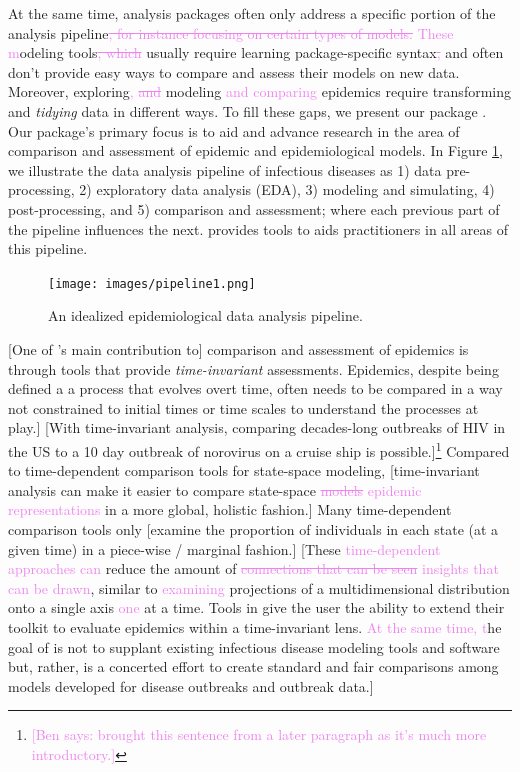 \documentclass[
  shortnames]{jss}
\begin{document}
At the same time, analysis packages often only address a specific
portion of the analysis
pipeline\textcolor{violet}{\sout{, for instance focusing on certain types of models.}}
\textcolor{violet}{These m}odeling
tools\textcolor{violet}{\sout{, which}} usually require learning
package-specific syntax\textcolor{violet}{\sout{,}} and often don't
provide easy ways to compare and assess their models on new data.
Moreover, exploring\textcolor{violet}{, \sout{and}} modeling
\textcolor{violet}{and comparing} epidemics require transforming and
\textit{tidying} data in different ways. To fill these gaps, we present
our  package . Our package's primary focus
is to aid and advance research in the area of comparison and assessment
of epidemic and epidemiological models. In Figure \ref{fig:pipeline}, we
illustrate the data analysis pipeline of infectious diseases as 1) data
pre-processing, 2) exploratory data analysis (EDA), 3) modeling and
simulating, 4) post-processing, and 5) comparison and assessment; where
each previous part of the pipeline influences the next. 
provides tools to aids practitioners in all areas of this pipeline.

\begin{figure}[!ht]
    \centering
    \texttt{[image: images/pipeline1.png]}
    \caption{An idealized epidemiological data analysis pipeline.}
    \label{fig:pipeline}
\end{figure}

{[}One of 's main contribution to{]} comparison and
assessment of epidemics is through tools that provide
\textit{time-invariant} assessments. Epidemics, despite being defined a
a process that evolves overt time, often needs to be compared in a way
not constrained to initial times or time scales to understand the
processes at play.{]} {[}With time-invariant analysis, comparing
decades-long outbreaks of HIV in the US to a 10 day outbreak of
norovirus on a cruise ship is
possible.{]}\footnote{\textcolor{violet}{[Ben says: brought this sentence from a later paragraph as it’s much more introductory.]}}
Compared to time-dependent comparison tools for state-space modeling,
{[}time-invariant analysis can make it easier to compare state-space
\textcolor{violet}{\sout{models} epidemic representations} in a more
global, holistic fashion.{]} Many time-dependent comparison tools only
{[}examine the proportion of individuals in each state (at a given time)
in a piece-wise / marginal fashion.{]} {[}These
\textcolor{violet}{time-dependent approaches can} reduce the amount of
\textcolor{violet}{\sout{connections that can be seen} insights that can be drawn},
similar to \textcolor{violet}{examining} projections of a
multidimensional distribution onto a single axis \textcolor{violet}{one}
at a time. Tools in  give the user the ability to extend
their toolkit to evaluate epidemics within a time-invariant lens.
\textcolor{violet}{At the same time, t}he goal of  is
not to supplant existing infectious disease modeling tools and software
but, rather, is a concerted effort to create standard and fair
comparisons among models developed for disease outbreaks and outbreak
data.{]}
\end{document}
